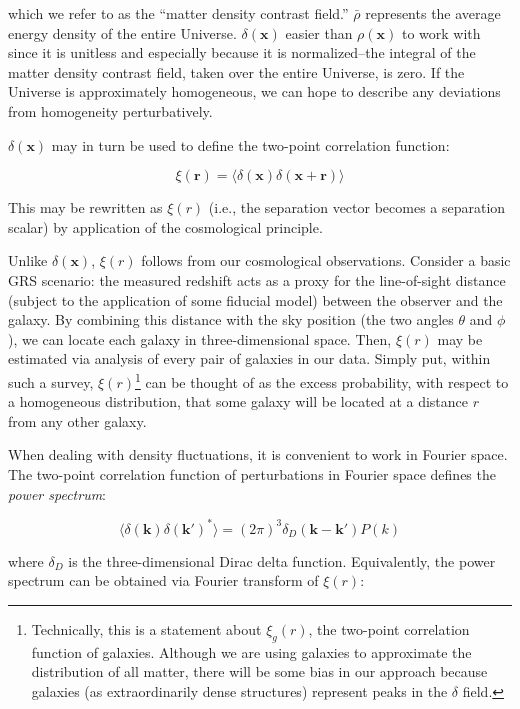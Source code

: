 which we refer to as the ``matter density contrast field.'' $\bar{\rho}$
represents the average energy density of the entire Universe. 
$\delta(\bm{x})$ easier than $\rho(\bm{x})$ to work with since it
is unitless and especially because it is normalized--the integral of the
matter density contrast field, taken over the entire Universe, is zero.
If the Universe is approximately homogeneous, we can hope to describe any
deviations from homogeneity perturbatively.

$\delta(\bm{x})$ may in turn be used to define the two-point correlation 
function:

\begin{equation}
\xi(\bm{r})
=
\langle \delta (\mathbf{x}) \delta(\mathbf{x} + \mathbf{r})\rangle
\end{equation}

This may be rewritten as $\xi(r)$ (i.e., the separation vector becomes a
separation scalar) by application of the cosmological principle.

Unlike $\delta(\bm{x})$, $\xi(r)$ follows from our cosmological
observations. Consider a basic GRS scenario: the
measured redshift acts as a proxy for the line-of-sight distance (subject to
the application of some fiducial model) between the observer and the galaxy. 
By combining this distance with the sky position (the two angles $\theta$ and
$\phi$), we can locate each galaxy in three-dimensional space. Then, $\xi(r)$ 
may be estimated via analysis of every pair of galaxies in our data. Simply
put, within such a survey, $\xi(r)$\footnote{Technically, this is a statement
about $\xi_g(r)$, the two-point correlation function of galaxies. Although we
are using galaxies to approximate the distribution of all matter, there will
be some bias in our approach because galaxies (as extraordinarily dense 
structures) represent peaks in the $\delta$ field.} can be thought
of as the excess probability, with respect to a homogeneous distribution, that 
some galaxy will be located at a distance $r$ from any other galaxy.

When dealing with density fluctuations, it is convenient to work in Fourier
space. The two-point correlation
function of perturbations in Fourier space
defines the \textit{power spectrum}:

\begin{equation}
\langle \delta (\bm{k}) \delta (\bm{k}')^* \rangle
=
(2 \pi)^3 \delta_D (\bm{k} - \bm{k}') P(k)
\end{equation}

where $\delta_D$ is the three-dimensional Dirac delta function.
Equivalently, the power spectrum can be obtained
via Fourier transform of $\xi(r)$:

